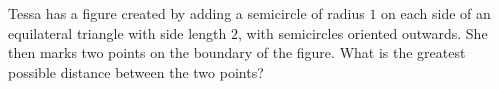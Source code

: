 Tessa has a figure created by adding a semicircle of radius $1$ on each side of an equilateral triangle with side length $2$, with semicircles oriented outwards. She then marks two points on the boundary of the figure. What is the greatest possible distance between the two points?